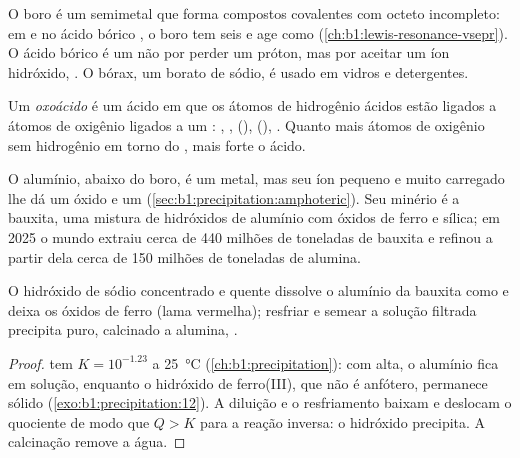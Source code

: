 O boro é um semimetal que forma compostos covalentes com octeto
incompleto: em  e no ácido bórico , o boro tem seis
 e age como  (\cref{ch:b1:lewis-resonance-vsepr}).
O ácido bórico é um  não por perder um próton, mas por aceitar
um íon hidróxido, . O bórax, um
borato de sódio, é usado em vidros e detergentes.

\begin{definition}[Oxoácido]\label{def:b1:p-block-13-15:oxoacid}
Um \emph{oxoácido} é um ácido em que os átomos de
hidrogênio ácidos estão ligados a átomos de oxigênio ligados a um : , ,  (), 
(), . Quanto mais átomos de oxigênio sem hidrogênio
em torno do , mais forte o ácido.
\end{definition}

O alumínio, abaixo do boro, é um metal, mas seu íon pequeno e muito
carregado lhe dá um óxido e um  (\cref{sec:b1:precipitation:amphoteric}).
Seu minério é a bauxita, uma mistura de hidróxidos de alumínio com óxidos
de ferro e sílica; em 2025 o mundo extraiu cerca de 440 milhões de
toneladas de bauxita e refinou a partir dela cerca de 150 milhões de
toneladas de alumina.

\begin{proposition}\label{prop:b1:p-block-13-15:bayer}
O hidróxido de sódio concentrado e quente dissolve o alumínio da bauxita
como  e deixa os óxidos de ferro (lama vermelha); resfriar e
semear a solução filtrada precipita  puro, calcinado a alumina,
.
\end{proposition}

\begin{proof}
 tem $K = 10^{-1.23}$ a
\qty{25}{\celsius} (\cref{ch:b1:precipitation}): com \ce{[OH-]} alta, o
alumínio fica em solução, enquanto o hidróxido de ferro(III), que não é
anfótero, permanece sólido (\cref{exo:b1:precipitation:12}). A diluição e
o resfriamento baixam \ce{[OH-]} e deslocam o quociente de modo que $Q > K$
para a reação inversa: o hidróxido precipita. A calcinação remove a água.
\end{proof}

